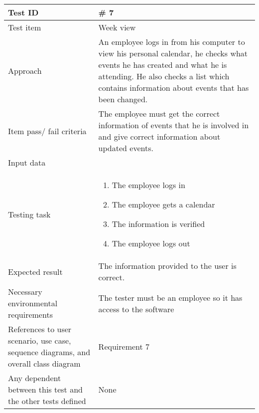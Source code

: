\documentclass[a4paper, 10pt]{article}
\begin{document}
\begin{tabularx}{\textwidth}{ |X|X| }
\hline
\rowcolor{Gray}
Test ID & \# 7 \\ \hline
Test item & Week view \\ \hline
Approach & An employee logs in from his computer to view his personal calendar, he checks what events he has created and what he is attending. He also checks a list which contains information about events that has been changed. \\ \hline
Item pass/ fail criteria & The employee must get the correct information of events that he is involved in and give correct information about updated events. \\ \hline
Input data & 
\begin*{}
	\item Username
	\item Password
\end{itemize}\\ \hline
Testing task & 
\begin{enumerate}
	\item The employee logs in
	\item The employee gets a calendar 
	\item The information is verified 
	\item The employee logs out
\end{enumerate} \\ \hline
Expected result & The information provided to the user is correct. \\ \hline
Necessary environmental requirements & The tester must be an employee so it has access to the software  \\ \hline
References to user scenario, use case, sequence diagrams, and overall class diagram & Requirement 7 \\ \hline
Any dependent between this test and the other tests defined & None   \\ \hline


\end{tabularx}
\end{document}
